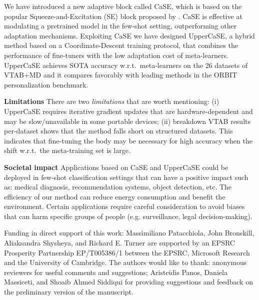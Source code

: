 \documentclass{article}
\begin{document}
We have introduced a new adaptive block called CaSE, which is based on the popular Squeeze-and-Excitation (SE) block proposed by \cite{hu2018squeeze}. CaSE is effective at modulating a pretrained model in the few-shot setting, outperforming other adaptation mechanisms. Exploiting CaSE we have designed UpperCaSE, a hybrid method based on a Coordinate-Descent training protocol, that combines the performance of fine-tuners with the low adaptation cost of meta-learners. UpperCaSE achieves SOTA accuracy w.r.t.~meta-learners on the 26 datasets of VTAB+MD and it compares favorably with leading methods in the ORBIT personalization benchmark. 

\textbf{Limitations} There are two \emph{limitations} that are worth mentioning: (i) UpperCaSE requires iterative gradient updates that are hardware-dependent and may be slow/unavailable in some portable devices; (ii) breakdown VTAB results per-dataset shows that the method falls short on structured datasets. This indicates that fine-tuning the body may be necessary for high accuracy when the shift w.r.t.~the meta-training set is large.

\textbf{Societal impact} Applications based on CaSE and UpperCaSE could be deployed in few-shot classification settings that can have a positive impact such as: medical diagnosis, recommendation systems, object detection, etc. The efficiency of our method can reduce energy consumption and benefit the environment. Certain applications require careful consideration to avoid biases that can harm specific groups of people (e.g. surveillance, legal decision-making).

\begin{ack}
Funding in direct support of this work: 
Massimiliano Patacchiola, John Bronskill, Aliaksandra Shysheya, and Richard E. Turner are supported by an EPSRC Prosperity Partnership EP/T005386/1 between the EPSRC,
Microsoft Research and the University of Cambridge. The authors would like to thank: anonymous reviewers for useful comments and suggestions; Aristeidis Panos, Daniela Massiceti, and Shoaib Ahmed Siddiqui for providing suggestions and feedback on the preliminary version of the manuscript.
\end{ack}











\clearpage
\appendix
\end{document}
